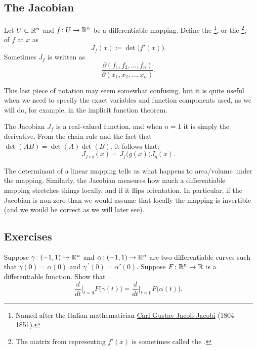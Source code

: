 \subsection{The Jacobian}

\begin{defn}
Let $U \subset {\mathbb{R}}^n$ and
$f \colon U \to {\mathbb{R}}^n$ be a differentiable mapping.  Define the
\emph{}%
\footnote{Named after the Italian mathematician
\href{https://en.wikipedia.org/wiki/Carl_Gustav_Jacob_Jacobi}{Carl Gustav Jacob Jacobi}
(1804--1851).},
or the
\emph{}%
\footnote{The matrix from  representing $f'(x)$
is sometimes called the
\emph{}.},
of $f$ at $x$ as
\begin{equation*}
J_f(x) \coloneqq \det\bigl( f'(x) \bigr) .
\end{equation*}
Sometimes $J_f$ is written as
\begin{equation*}
\frac{\partial(f_1,f_2,\ldots,f_n)}{\partial(x_1,x_2,\ldots,x_n)} .
\end{equation*}
\end{defn}

This last piece of notation may seem somewhat confusing,
but it is quite useful when we need to specify
the exact variables and function components used,
as we will do, for example, in the implicit function theorem.

The Jacobian $J_f$ is a real-valued function, and when $n=1$ it is simply the
derivative.
From the chain rule and the fact that $\det(AB) = \det(A)\det(B)$, it follows that:
\begin{equation*}
J_{f \circ g} (x) = J_f\bigl(g(x)\bigr) J_g(x) .
\end{equation*}

The determinant of a linear mapping tells us what happens to
area/volume under the mapping.
Similarly, the Jacobian measures how much a differentiable mapping stretches
things locally, and if it flips orientation.  In particular, if the Jacobian
is non-zero than we would assume that locally the mapping is invertible (and
we would be correct as we will later see).

\subsection{Exercises}

\begin{exercise}
Suppose $\gamma \colon (-1,1) \to {\mathbb{R}}^n$ and
$\alpha \colon (-1,1) \to {\mathbb{R}}^n$ are two differentiable curves
such that $\gamma(0) = \alpha(0)$ and $\gamma^{\:\prime}(0) = \alpha'(0)$.
Suppose $F \colon {\mathbb{R}}^n \to {\mathbb{R}}$ is a differentiable function.  Show that
\begin{equation*}
\frac{d}{dt}\Big|_{t=0}
F\bigl(\gamma(t)\bigr)
=
\frac{d}{dt}\Big|_{t=0}
F\bigl(\alpha(t)\bigr)
.
\end{equation*}
\end{exercise}

